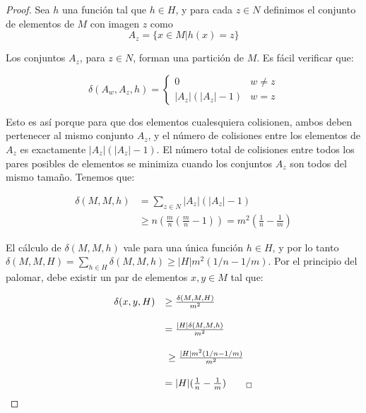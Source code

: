 \documentclass[a4paper,10pt, oneside]{article}
\begin{document}
\begin{proof}
	Sea $h$ una función tal que $h \in H$, y para cada $z \in N$ definimos el conjunto de elementos de $M$ con imagen $z$ como
	\begin{equation}
		A_z = \{  x \in M | h(x) = z \}
	\end{equation}
	
	Los conjuntos $A_z$, para $z \in N$, forman una partición de $M$. Es fácil verificar que:
	
	\begin{equation}
		\delta(A_w,A_z,h) = \left\{
									\begin{array}{cl}
										0 & w \neq z \\
										|A_z|(|A_z| - 1) & w=z
									\end{array}
								\right.
	\end{equation}
	
	Esto es así porque para que dos elementos cualesquiera colisionen, ambos deben pertenecer al mismo conjunto $A_z$, y el número de colisiones entre los elementos de $A_z$ es exactamente $|A_z|(|A_z| - 1)$. El número total de colisiones entre todos los pares posibles de elementos se minimiza cuando los conjuntos $A_z$ son todos del mismo tamaño. Tenemos que:
	
	\begin{equation}
		\begin{array}{ll} 
			\delta(M,M,h) & = \sum\limits_{z \in N} |A_z|(|A_z| - 1) \\[0.5cm]
									& \geq n (\frac{m}{n} (\frac{m}{n} - 1)) = m^2(\frac{1}{n}-\frac{1}{m})
		\end{array}
	\end{equation}
	
	El cálculo de $\delta(M,M,h)$ vale para una única función $h \in H$, y por lo tanto $\delta(M,M,H) = \sum_{h \in H} \delta(M,M,h) \geq |H|m^2(1/n-1/m)$. Por el principio del palomar, debe existir un par de elementos $x, y \in M$ tal que:
	
	\begin{equation}
		\begin{array}{ll}
			\delta(x,y,H) & \geq \frac{\delta(M,M,H)}{m^2} \\[0.5cm]
								  & = \frac{|H|\delta(M,M,h)}{m^2} \\[0.5cm]
								  & \geq \frac{|H|m^2(1/n-1/m)}{m^2}\\[0.5cm]
								  & = |H|(\frac{1}{n}-\frac{1}{m})_{\qed}
		\end{array}
	\end{equation}

\end{proof}
\end{document}
